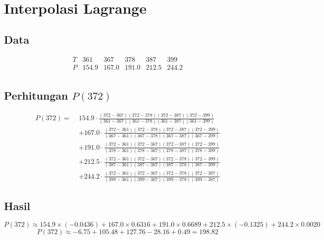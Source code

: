 \documentclass{article}
\begin{document}
\section*{Interpolasi Lagrange}

\subsection*{Data}
\[
\begin{array}{c|ccccc}
T & 361 & 367 & 378 & 387 & 399 \\
\hline
P & 154.9 & 167.0 & 191.0 & 212.5 & 244.2 \\
\end{array}
\]

\subsection*{Perhitungan \( P(372) \)}


\begin{align*}
P(372) = \;& 154.9 \cdot \frac{(372-367)(372-378)(372-387)(372-399)}{(361-367)(361-378)(361-387)(361-399)} \\
& + 167.0 \cdot \frac{(372-361)(372-378)(372-387)(372-399)}{(367-361)(367-378)(367-387)(367-399)} \\
& + 191.0 \cdot \frac{(372-361)(372-367)(372-387)(372-399)}{(378-361)(378-367)(378-387)(378-399)} \\
& + 212.5 \cdot \frac{(372-361)(372-367)(372-378)(372-399)}{(387-361)(387-367)(387-378)(387-399)} \\
& + 244.2 \cdot \frac{(372-361)(372-367)(372-378)(372-387)}{(399-361)(399-367)(399-378)(399-387)}
\end{align*}

\subsection*{Hasil}
\[
P(372) \approx 154.9 \times (-0.0436) + 167.0 \times 0.6316 + 191.0 \times 0.6689 + 212.5 \times (-0.1325) + 244.2 \times 0.0020
\]
\[
P(372) \approx -6.75 + 105.48 + 127.76 - 28.16 + 0.49 = \boxed{198.82}
\]
\end{document}
